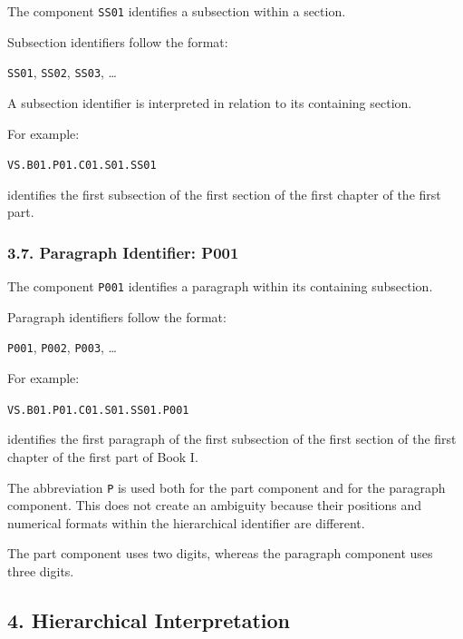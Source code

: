 The component \texttt{SS01} identifies
a subsection within a section.

Subsection identifiers follow the format:

\begin{center}
    \texttt{SS01}, \texttt{SS02},
    \texttt{SS03}, \ldots
\end{center}

A subsection identifier is interpreted
in relation to its containing section.

For example:

\begin{center}
    \texttt{VS.B01.P01.C01.S01.SS01}
\end{center}

identifies the first subsection of the
first section of the first chapter of
the first part.

\subsubsection*{3.7. Paragraph Identifier: P001}

The component \texttt{P001} identifies
a paragraph within its containing
subsection.

Paragraph identifiers follow the format:

\begin{center}
    \texttt{P001}, \texttt{P002},
    \texttt{P003}, \ldots
\end{center}

For example:

\begin{center}
    \texttt{VS.B01.P01.C01.S01.SS01.P001}
\end{center}

identifies the first paragraph of
the first subsection of the first
section of the first chapter of
the first part of Book I.

The abbreviation \texttt{P} is used
both for the part component and for
the paragraph component. This does
not create an ambiguity because
their positions and numerical formats
within the hierarchical identifier
are different.

The part component uses two digits,
whereas the paragraph component
uses three digits.


\subsection*{4. Hierarchical Interpretation}

